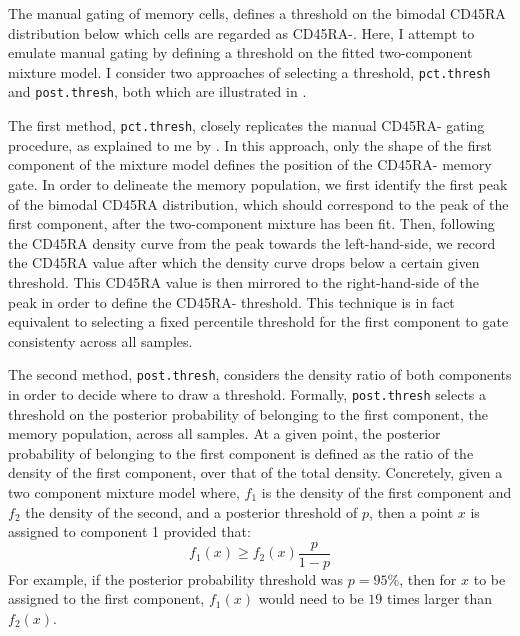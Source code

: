 The manual gating of memory cells, defines a threshold on the bimodal CD45RA distribution below which cells are regarded as CD45RA-.
Here, I attempt to emulate manual gating by defining a threshold on the fitted two-component mixture model.
I consider two approaches of selecting a threshold, \texttt{pct.thresh} and \texttt{post.thresh}, both which are illustrated in .

The first method, \texttt{pct.thresh}, closely replicates the manual CD45RA- gating procedure, as explained to me by .
In this approach, only the shape of the first component of the mixture model defines the position of the CD45RA- memory gate.
In order to delineate the memory population, we first identify the first peak of the bimodal CD45RA distribution,
which should correspond to the peak of the first component, after the two-component mixture has been fit.
Then, following the CD45RA density curve from the peak towards the left-hand-side,
we record the CD45RA value after which the density curve drops below a certain given threshold.
This CD45RA value is then mirrored to the right-hand-side of the peak in order to define the CD45RA- threshold.
This technique is in fact equivalent to selecting a fixed percentile threshold
for the first component to gate consistenty across all samples.

The second method, \texttt{post.thresh}, considers the density ratio of both components in order to decide where to draw a threshold.
Formally, \texttt{post.thresh} selects a threshold on the posterior probability of belonging to the first component, the memory population, across all samples.
At a given point, the posterior probability of belonging to the first component is defined as the ratio of the density of the first component,
over that of the total density.
Concretely, given a two component mixture model where, $f_1$ is the density of the first component and $f_2$ the density of the second, and a posterior threshold of $p$,
then a point $x$ is assigned to component 1 provided that:
\[
  f_1(x) \geq f_2(x) \dfrac{p}{1-p}
\]
For example, if the posterior probability threshold was $p=95\%$, then for $x$ to be assigned to the first component, $f_1(x)$ would need to be $19$ times larger than $f_2(x)$.

